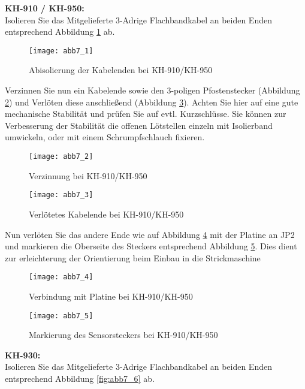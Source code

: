 \documentclass[fleqn,10pt]{SelfArx} %
\begin{document}
\textbf{KH-910 / KH-950:} \\

Isolieren Sie das Mitgelieferte 3-Adrige Flachbandkabel an beiden Enden entsprechend Abbildung \ref{fig:abb7_1} ab.

\begin{figure}[tbhp]\centering
\texttt{[image: abb7\_1]}
\caption{Abisolierung der Kabelenden bei KH-910/KH-950}
\label{fig:abb7_1}
\end{figure}

Verzinnen Sie nun ein Kabelende sowie den 3-poligen Pfostenstecker (Abbildung \ref{fig:abb7_2}) und Verlöten diese anschließend (Abbildung \ref{fig:abb7_3}). Achten Sie hier auf eine gute mechanische Stabilität und prüfen Sie auf evtl. Kurzschlüsse. Sie können zur Verbesserung der Stabilität die offenen Lötstellen einzeln mit Isolierband umwickeln, oder mit einem Schrumpfschlauch fixieren.

\begin{figure}[tbhp]\centering
\texttt{[image: abb7\_2]}
\caption{Verzinnung bei KH-910/KH-950}
\label{fig:abb7_2}
\end{figure}

\begin{figure}[tbhp]\centering
\texttt{[image: abb7\_3]}
\caption{Verlötetes Kabelende bei KH-910/KH-950}
\label{fig:abb7_3}
\end{figure}

Nun verlöten Sie das andere Ende wie auf Abbildung \ref{fig:abb7_4} mit der Platine an JP2 und markieren die Oberseite des Steckers entsprechend Abbildung \ref{fig:abb7_5}. Dies dient zur erleichterung der Orientierung beim Einbau in die Strickmaschine\par

\begin{figure}[tbhp]\centering
\texttt{[image: abb7\_4]}
\caption{Verbindung mit Platine bei KH-910/KH-950}
\label{fig:abb7_4}
\end{figure}

\begin{figure}[tbhp]\centering
\texttt{[image: abb7\_5]}
\caption{Markierung des Sensorsteckers bei KH-910/KH-950}
\label{fig:abb7_5}
\end{figure}

\FloatBarrier

\textbf{KH-930:} \\

Isolieren Sie das Mitgelieferte 3-Adrige Flachbandkabel an beiden Enden entsprechend Abbildung \ref{fig:abb7_6} ab.
\end{document}
